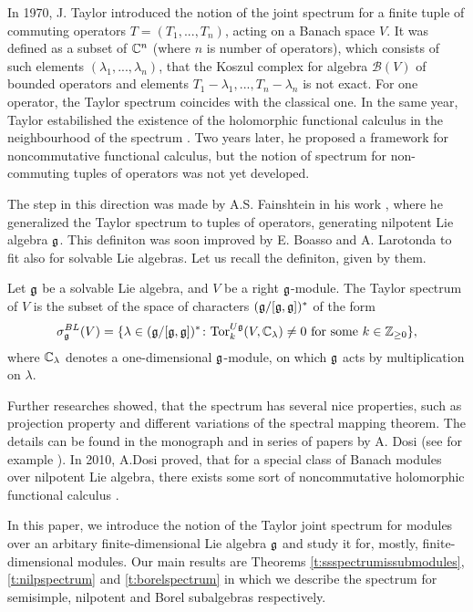 In 1970, J. Taylor\cite{Taylor1970} introduced the notion of the joint spectrum for a finite tuple
of commuting operators $T = (T_1,...,T_n)$, acting on a Banach space $V$. It was defined as a
subset of $\mathbb{C}^n$ (where $n$ is number of operators), which consists of such elements
$(\lambda_1,...,\lambda_n)$, that the Koszul complex for algebra $\mathcal{B}(V)$ of bounded
operators and elements $T_1 - \lambda_1,...,T_n - \lambda_n$ is not exact. For one operator, the
Taylor spectrum coincides with the classical one. In the same year, Taylor estabilished the
existence of the holomorphic functional calculus in the neighbourhood of the spectrum
\cite{Taylor1970b}. Two years later, he proposed a framework for noncommutative functional
calculus\cite{Taylor1972}, but the notion of spectrum for non-commuting tuples of operators was not
yet developed. 

The step in this direction was made by A.S. Fainshtein in his work \cite{Fainshtein}, where he
generalized the Taylor spectrum to tuples of operators, generating nilpotent Lie algebra $\mathfrak{g}$.
This definiton was soon improved by E. Boasso and A. Larotonda \cite{boasso} to fit also for solvable Lie
algebras. Let us recall the definiton, given by them.
\begin{definition}
    Let $\mathfrak{g}$ be a solvable Lie algebra, and $V$ be a right $\mathfrak{g}$-module. The Taylor spectrum
    of $V$ is the subset of the space of characters $(\mathfrak{g}/[\mathfrak{g},\mathfrak{g}])^*$ of the form
    \begin{equation} \label{e:boassolarotonda}
        \sigma^{BL}_{\mathfrak{g}}(V) = \{ \lambda \in (\mathfrak{g}/[\mathfrak{g},\mathfrak{g}])^*\colon \mathrm{Tor}^{U\mathfrak{g}}_k(V,
            \mathbb{C}_\lambda)\neq 0 \text{ for some } k \in \mathbb{Z}_{\geq0}\},
    \end{equation}
    where $\mathbb{C}_\lambda$ denotes a one-dimensional $\mathfrak{g}$-module, on which $\mathfrak{g}$ acts by
    multiplication on $\lambda$.
\end{definition}
Further researches showed, that the spectrum has several nice properties, such as projection
property and different variations of the spectral mapping theorem. The details can be found in the
monograph \cite{beltita} and in series of papers by A. Dosi (see for example
\cite{Dosi1}\cite{Dosi2}\cite{Dosi3}). In 2010, A.Dosi proved, that for a special class of Banach
modules over nilpotent Lie algebra, there exists some sort of noncommutative holomorphic functional
calculus \cite{Dosi4}.

In this paper, we introduce the notion of the Taylor joint spectrum for modules over an
arbitary finite-dimensional Lie algebra $\mathfrak{g}$ and study it for, mostly, finite-dimensional
modules. Our main results are Theorems \ref{t:ssspectrumissubmodules}, \ref{t:nilpspectrum} and
\ref{t:borelspectrum} in which we describe the spectrum for semisimple, nilpotent and Borel
subalgebras respectively.   
